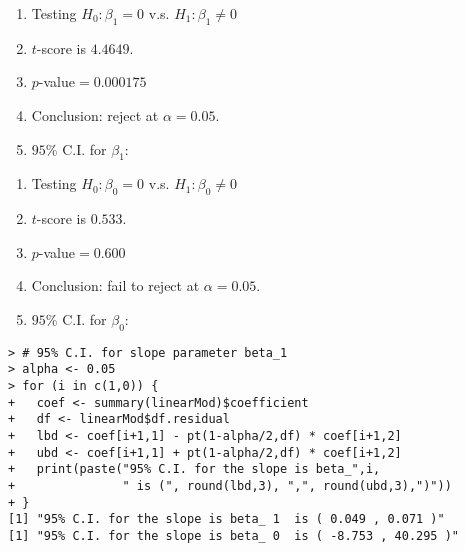 \begin{frame}[fragile]
	\vspace{2em}

	\begin{minipage}{0.45\textwidth}
	\begin{enumerate}
		\item[] Testing $H_0: \beta_1 = 0$ v.s. $H_1:\beta_1\ne 0$\\
		\item[] $t$-score is $4.4649$.
		\item[] $p$-value$=0.000175$
		\item[] Conclusion: reject at $\alpha=0.05$.
			\vspace{1em}
		\item[] $95\%$ C.I. for $\beta_1$:
	\end{enumerate}
	\end{minipage}
	\begin{minipage}{0.45\textwidth}
	\begin{enumerate}
		\item[] Testing $H_0: \beta_0 = 0$ v.s. $H_1:\beta_0\ne 0$\\
		\item[] $t$-score is $0.533$.
		\item[] $p$-value$=0.600$
		\item[] Conclusion: fail to reject at $\alpha=0.05$.
			\vspace{1em}
		\item[] $95\%$ C.I. for $\beta_0$:
	\end{enumerate}
	\end{minipage}
	\vfill
	\begin{center}
		\begin{minipage}{0.7\textwidth}
\begin{lstlisting}
> # 95% C.I. for slope parameter beta_1
> alpha <- 0.05
> for (i in c(1,0)) {
+   coef <- summary(linearMod)$coefficient
+   df <- linearMod$df.residual
+   lbd <- coef[i+1,1] - pt(1-alpha/2,df) * coef[i+1,2]
+   ubd <- coef[i+1,1] + pt(1-alpha/2,df) * coef[i+1,2]
+   print(paste("95% C.I. for the slope is beta_",i,
+               " is (", round(lbd,3), ",", round(ubd,3),")"))
+ }
[1] "95% C.I. for the slope is beta_ 1  is ( 0.049 , 0.071 )"
[1] "95% C.I. for the slope is beta_ 0  is ( -8.753 , 40.295 )"
\end{lstlisting}
		\end{minipage}
	\end{center}
\end{frame}

